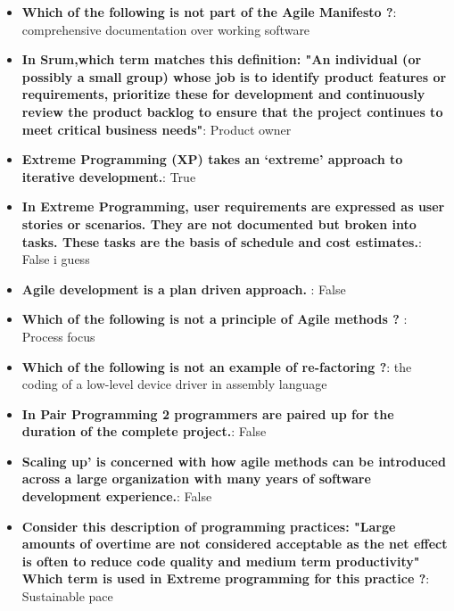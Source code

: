 \documentclass{report}
\begin{document}
    \pagebreak 
    \begin{itemize}
        \item \textbf{Which of the following is not part of the Agile Manifesto ?}: comprehensive documentation over working software 
        \item \textbf{In Srum,which term matches this definition: "An individual (or possibly a small group) whose job is to identify product features or requirements, prioritize these for development and continuously review the product backlog to ensure that the project continues to meet critical business needs"}: Product owner
        \item \textbf{Extreme Programming (XP) takes an ‘extreme’ approach to iterative development.}: True
        \item \textbf{In Extreme Programming, user requirements are expressed as user stories or scenarios. They are not documented but broken into tasks. These tasks are the basis of schedule and cost estimates.}: False i guess
        \item \textbf{Agile development is a plan driven approach. }: False
        \item \textbf{Which of the following is not a principle of Agile methods ? }: Process focus
        \item \textbf{Which of the following is not an example of re-factoring ?}: the coding of a low-level device driver in assembly language
        \item \textbf{In Pair Programming 2 programmers are paired up for the duration of the complete project.}: False
        \item \textbf{Scaling up’ is concerned with how agile methods can be introduced across a large organization with many years of software development experience.}: False
        \item \textbf{Consider this description of programming practices: "Large amounts of overtime are not considered acceptable as the net effect is often to reduce code quality and medium term productivity" Which term is used in Extreme programming for this practice ?}: Sustainable pace
    \end{itemize}
\end{document}
